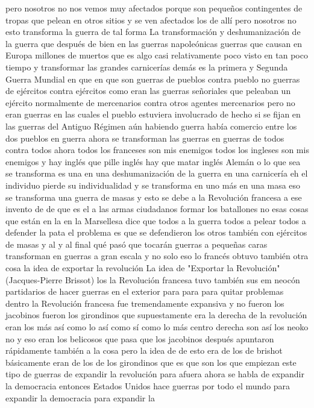 pero nosotros no nos vemos muy afectados porque son pequeños contingentes de tropas que pelean en otros sitios
y se ven afectados los de allí pero nosotros no esto transforma la guerra de tal forma
La transformación y deshumanización de la guerra
que después de bien en las guerras napoleónicas guerras que causan en Europa millones de muertos que es algo casi
relativamente poco visto en tan poco tiempo y transformar las grandes carnicerías demás es la primera y Segunda Guerra Mundial
en que en que son guerras de pueblos contra pueblo no guerras de ejércitos contra ejércitos como eran las guerras señoriales
que peleaban un ejército normalmente de mercenarios contra otros agentes mercenarios pero no eran guerras en las cuales el pueblo estuviera involucrado
de hecho si se fijan en las guerras del Antiguo Régimen aún habiendo guerra había comercio entre los dos pueblos en guerra ahora se transforman las guerras
en guerras de todos contra todos ahora todos los franceses son mis enemigos todos los ingleses son mis enemigos
y hay inglés que pille inglés hay que matar inglés Alemán o lo que sea se transforma es una en una deshumanización de la guerra
en una carnicería eh el individuo pierde su individualidad y se transforma en uno más en una masa eso se transforma una guerra de masas
y esto se debe a la Revolución francesa a ese invento de de que es el a las armas ciudadanos
formar los batallones no esas cosas que están en la en la Marsellesa dice que todos a la guerra
todos a pelear todos a defender la pata el problema es que se defendieron los otros también con ejércitos de masas
y al y al final qué pasó que tocarán guerras a pequeñas caras transforman en guerras a gran escala
y no solo eso lo francés obtuvo también otra cosa la idea de exportar la revolución
La idea de "Exportar la Revolución" (Jacques-Pierre Brissot)
los la Revolución francesa tuvo también sus em neocón
partidarios de hacer guerras en el exterior para para para quitar problemas dentro la Revolución francesa fue tremendamente expansiva
y no fueron los jacobinos fueron los girondinos que supuestamente era la derecha
de la revolución eran los más así como lo así como sí como lo más centro derecha son así
los neoko no y eso eran los belicosos que pasa que los jacobinos después apuntaron rápidamente
también a la cosa pero la idea de de esto era de los de brishot básicamente eran de los de los girondinos
que es que son los que empiezan este tipo de guerras de expandir la revolución para afuera ahora se habla de expandir la democracia
entonces Estados Unidos hace guerras por todo el mundo para expandir la democracia para expandir la
